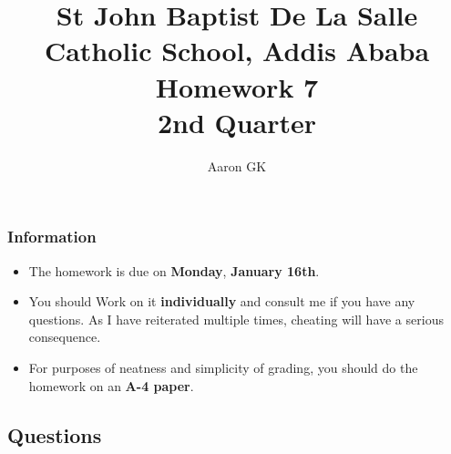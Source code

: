 \documentclass[9pt,addpoints]{exam}
\author{Aaron GK}
\begin{document}
	\title{St John Baptist De La Salle Catholic School, Addis Ababa\\
		\large Homework 7 \\
		2nd Quarter}
	\maketitle
	\begin{center}
		\subsubsection*{Information}
		\begin{itemize}
			\item The homework is due on \textbf{Monday}, \textbf{January 16th}.
			\item You should Work on it \textbf{individually} and consult me if you have any questions. As I have reiterated multiple times, cheating will have a serious consequence.
			\item For purposes of neatness and simplicity of grading, you should do the homework on an \textbf{A-4 paper}.
		\end{itemize}
	\end{center}
	\begin{center}
		\subsection*{Questions}
	\end{center}
	
\end{document}
